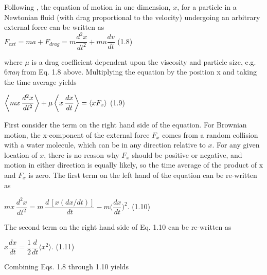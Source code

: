 Following \citep{Reif}, the equation of motion in one dimension, $x$,  for a particle in a Newtonian fluid (with drag proportional to the velocity) undergoing an arbitrary external force can be written as \\

\hspace{45mm} $F_{ext} = ma + F_{drag} = m \dfrac{d^2x}{dt^2} + mu\dfrac{dv}{dt}$ \hspace*{0pt}\hfill (1.8) 
\vspace{7mm}

where $\mu$ is a drag coefficient dependent upon the viscosity and particle size, e.g. $6 \pi a\eta$ from Eq. 1.8 above. Multiplying the equation by the position x and taking the time average yields


\vspace{7mm}
\hspace{52mm} $\biggl\langle mx\,\dfrac{d^2x}{dt^2}\biggr\rangle +
\mu\,\biggl\langle x\,\dfrac{dx}{dt}\biggr\rangle =
\langle{xF_x}\rangle\notag$ \hspace*{0pt}\hfill (1.9) 
\vspace{7mm}

First consider the term on the right hand side of the equation.  For Brownian motion, the x-component of the external force $F_x$ comes from a random collision with a water molecule, which can be in any direction relative to $x$. For any given location of $x$, there is no reason why $F_x$ should be positive or negative, and motion in either direction is equally likely, so the time average of the product of x and $F_x$ is zero. The first term on the left hand of the equation can be re-written as

\vspace{7mm}
\hspace{52mm} $mx\,\dfrac{d^2x}{dt^2} = m\,\dfrac{d\, [x(dx/dt)]}{dt} -
m\biggl(\dfrac{dx}{dt}\biggr)^2.
$ \hspace*{0pt}\hfill (1.10) 
\vspace{7mm}

The second term on the right hand side of Eq. 1.10 can be re-written as

\vspace{7mm}
\hspace{52mm} $x \dfrac{dx}{dt} = \dfrac{1}{2} \dfrac{d}{dt} \langle x^2 \rangle .
$ \hspace*{0pt}\hfill (1.11) 
\vspace{7mm}

Combining Eqs. 1.8 through 1.10 yields

